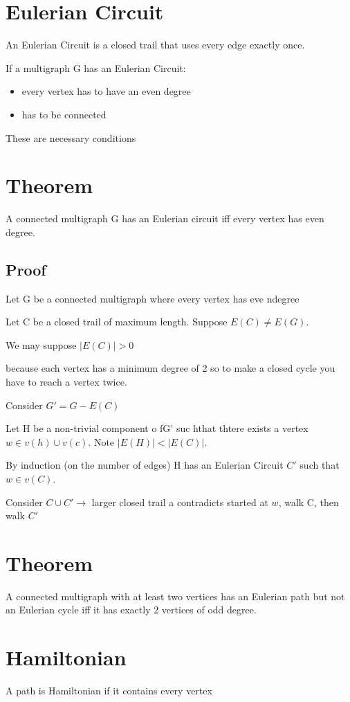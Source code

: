\documentclass{report}
\begin{document}
\section{Eulerian Circuit}
An Eulerian Circuit is a closed trail that uses every edge exactly once.


If a multigraph G has an Eulerian Circuit:
\begin{itemize}
\item
every vertex has to have an even degree
\item
has to be connected
\end{itemize}
These are necessary conditions

\section{Theorem}
A connected multigraph G has an Eulerian circuit iff every vertex has even degree.

\subsection{Proof}
Let G be a connected multigraph where every vertex has eve ndegree

Let C be a closed trail of maximum length. Suppose $E(C) \neq E(G)$.

We may suppose $|E(C)| > 0$

because each vertex has a minimum degree of 2 so to make a closed cycle you have to reach a vertex twice.

Consider $G' = G - E(C)$

Let H be a non-trivial component o fG' suc hthat thtere exists a vertex $w \in v(h) \cup v(c)$.
Note $|E(H)| < |E(C)|$.

By induction (on the number of edges) H has an Eulerian Circuit $C'$ such that $w \in v(C)$.

Consider $C \cup C' \to$ larger closed trail a contradicts started at $w$, walk C, then walk $C'$



\section{Theorem}
A connected multigraph with at least two vertices has an Eulerian path but not an Eulerian cycle iff it has exactly 2 vertices of odd degree.

\section{Hamiltonian}
A path is Hamiltonian if it contains every vertex
\end{document}

